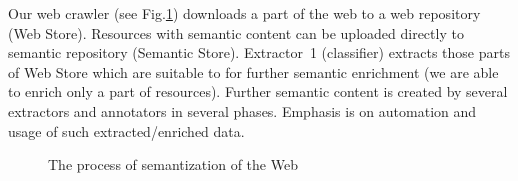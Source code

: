 \documentclass{sig-alternate}
\begin{document}
Our web crawler (see Fig.\ref{img:Semantization}) downloads a part of the web to a web repository (Web Store). Resources with semantic content can be uploaded directly to semantic repository (Semantic Store). Extractor~1 (classifier) extracts those parts of Web Store which are suitable to for further semantic enrichment (we are able to enrich only a part of resources). Further semantic content is created by several extractors and annotators in several phases. Emphasis is on automation and usage of such extracted/enriched data.

\begin{figure}
\centering
{}
\caption{The process of semantization of the Web}
\label{img:Semantization}
\end{figure}





\end{document}
